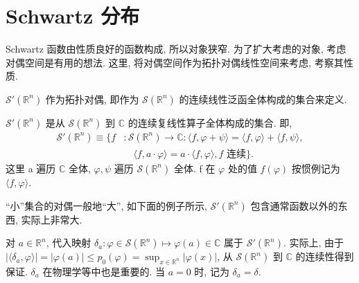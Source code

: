 
\section{Schwartz 分布}\label{sec:5.3}




Schwartz 函数由性质良好的函数构成, 所以对象狭窄. 为了扩大考虑的对象, 考虑对偶空间是有用的想法. 这里, 将对偶空间作为拓扑对偶线性空间来考虑, 考察其性质.

$\mathcal{S}'(\mathbb{R}^{n})$ 作为拓扑对偶, 即作为 $\mathcal{S}(\mathbb{R}^{n})$ 的连续线性泛函全体构成的集合来定义.

\begin{definition}[Schwartz 分布 (空间)]\label{def:5.2}
$\mathcal{S}'(\mathbb{R}^{n})$ 是从 $\mathcal{S}(\mathbb{R}^{n})$ 到 $\mathbb{C}$ 的连续复线性算子全体构成的集合. 即,
\[
\begin{aligned}
\mathcal{S}'(\mathbb{R}^{n}) \equiv \{f &: \mathcal{S}(\mathbb{R}^{n}) \to \mathbb{C} : \langle f, \varphi + \psi \rangle = \langle f, \varphi \rangle + \langle f, \psi \rangle, \\
&\quad \langle f, a \cdot \varphi \rangle = a \cdot \langle f, \varphi \rangle, f \text{ 连续}\}.
\end{aligned}
\]
这里 a 遍历 $\mathbb{C}$ 全体, $\varphi, \psi$ 遍历 $\mathcal{S}(\mathbb{R}^{n})$ 全体. f 在 $\varphi$ 处的值 $f(\varphi)$ 按惯例记为 $\langle f, \varphi \rangle$.
\end{definition}

``小''集合的对偶一般地``大'', 如下面的例子所示, $\mathcal{S}'(\mathbb{R}^{n})$ 包含通常函数以外的东西, 实际上非常大.

\begin{example}\label{exa:5.8}
对 $a \in \mathbb{R}^{n}$, 代入映射 $\delta_{a}: \varphi \in \mathcal{S}(\mathbb{R}^{n}) \mapsto \varphi(a) \in \mathbb{C}$ 属于 $\mathcal{S}'(\mathbb{R}^{n})$. 实际上, 由于 $|\langle\delta_{a}, \varphi\rangle| = |\varphi(a)| \leq p_{0}(\varphi) = \sup_{x \in \mathbb{R}^{n}}|\varphi(x)|$, 从 $\mathcal{S}(\mathbb{R}^{n})$ 到 $\mathbb{C}$ 的连续性得到保证. $\delta_{a}$ 在物理学等中也是重要的. 当 $a = 0$ 时, 记为 $\delta_{a} = \delta$.
\end{example}

